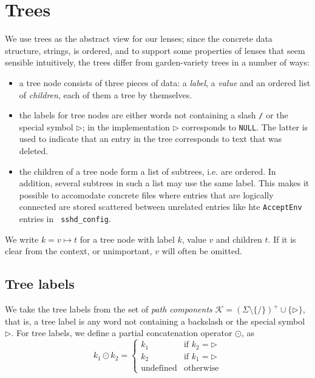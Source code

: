 \documentclass[12pt,fleqn]{amsart}
\newcommand{\ensmath}[1]{\ensuremath{#1}\xspace}
\newcommand{\xconc}[2]{\ensmath{#1\odot #2}}
\newcommand{\tmapv}[3]{\ensmath{#1 = #2\mapsto #3}}
\newcommand{\Keys}{\ensmath{\mathcal{K}}}
\begin{document}
\section{Trees}
We use trees as the abstract view for our lenses; since the concrete data
structure, strings, is ordered, and to support some properties of lenses
that seem sensible intuitively, the trees differ from garden-variety trees
in a number of ways:
\begin{itemize}
  \item a tree node consists of three pieces of data: a \emph{label}, a
    \emph{value} and an ordered list of \emph{children}, each of them a
    tree by themselves.
  \item the labels for tree nodes are either words not containing a slash
    {\tt /} or the special symbol $\rhd$; in the implementation $\rhd$
    corresponds to {\tt NULL}. The latter is used to indicate
    that an entry in the tree corresponds to text that was deleted.
  \item the children of a tree node form a list of subtrees, i.e. are
    ordered. In addition, several subtrees in such a list may use the same
    label. This makes it possible to accomodate concrete files where
    entries that are logically connected are stored scattered between
    unrelated entries like hte {\tt AcceptEnv} entries in {\tt
      sshd\_config}.
\end{itemize}

We write $\tmapv{k}{v}{t}$ for a tree node with label $k$, value $v$ and
children $t$. If it is clear from the context, or unimportant, $v$ will
often be omitted.

\subsection{Tree labels}
We take the tree labels from the set of \emph{path components} $\Keys =
(\Sigma \setminus \{ {\mathtt /} \})^+ \cup \{ \rhd \}$, that is,
a tree label is any word not containing a backslash or the special symbol
$\rhd$. For tree labels, we define a partial concatenation operator
$\odot$, as
\begin{equation*}
  \xconc{k_1}{k_2} = \begin{cases}
    k_1 & \text{if } k_2 = \rhd\\
    k_2 & \text{if } k_1 = \rhd\\
    \text{undefined} & \text{otherwise}
  \end{cases}
\end{equation*}
\end{document}

